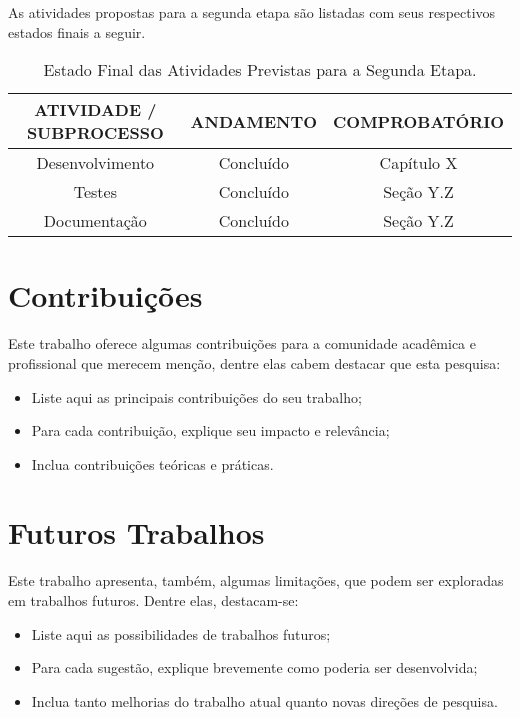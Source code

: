 As atividades propostas para a segunda etapa são listadas com seus respectivos estados finais a seguir.

\begin{table}[h]
\centering
{\renewcommand{\arraystretch}{1.5}
\scriptsize
\caption[Estado Final das Atividades Segunda Etapa]{Estado Final das Atividades Previstas para a Segunda Etapa.}
\label{status-segunda-etapa}
\begin{tabular}{ccc}
\hline
\textbf{ATIVIDADE / SUBPROCESSO} & \textbf{ANDAMENTO} & \textbf{COMPROBATÓRIO} \\ \hline
Desenvolvimento & Concluído & Capítulo X \\ \hline
Testes & Concluído & Seção Y.Z \\ \hline
Documentação & Concluído & Seção Y.Z \\ \hline
\end{tabular}
}
\end{table}

\section{Contribuições}
\label{status-contribuicoes}
Este trabalho oferece algumas contribuições para a comunidade acadêmica e profissional que merecem menção, dentre elas cabem destacar que esta pesquisa:

\begin{itemize}
\item Liste aqui as principais contribuições do seu trabalho;
\item Para cada contribuição, explique seu impacto e relevância;
\item Inclua contribuições teóricas e práticas.
\end{itemize}

\section{Futuros Trabalhos}
\label{status-futuros}
Este trabalho apresenta, também, algumas limitações, que podem ser exploradas em trabalhos futuros. Dentre elas, destacam-se:

\begin{itemize}
\item Liste aqui as possibilidades de trabalhos futuros;
\item Para cada sugestão, explique brevemente como poderia ser desenvolvida;
\item Inclua tanto melhorias do trabalho atual quanto novas direções de pesquisa.
\end{itemize}

